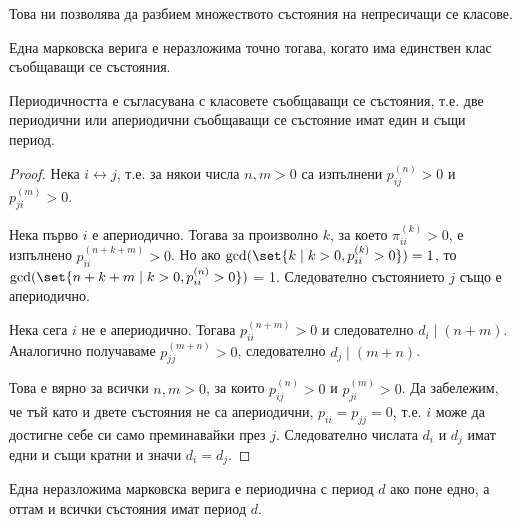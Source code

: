 \documentclass{../../common/topic}
\begin{document}
Това ни позволява да разбием множеството състояния на непресичащи се класове.

\begin{corollary}
  Една марковска верига е неразложима точно тогава, когато има единствен клас съобщаващи се състояния.
\end{corollary}

\begin{proposition}
  Периодичността е съгласувана с класовете съобщаващи се състояния, т.е. две периодични или апериодични съобщаващи се състояние имат един и същи период.
\end{proposition}
\begin{proof}
  Нека \( i \leftrightarrow j \), т.е. за някои числа \( n, m > 0 \) са изпълнени \( p_{ij}^{(n)} > 0 \) и \( p_{ji}^{(m)} > 0 \).

  Нека първо \( i \) е апериодично. Тогава за произволно \( k \), за което \( \pi_{ii}^{(k)} > 0 \), е изпълнено \( p_{ii}^{(n+k+m)} > 0 \). Но ако \( \gcd (\set{ k \mid k > 0, p_{ii}^{(k)} > 0 }) = 1 \), то \( \gcd (\set{ n+k+m \mid k > 0, p_{ii}^{(n)} > 0 }) \) = 1. Следователно състоянието \( j \) също е апериодично.

  Нека сега \( i \) не е апериодично. Тогава \( p_{ii}^{(n+m)} > 0 \) и следователно \( d_i \mid (n+m) \). Аналогично получаваме \( p_{jj}^{(m+n)} > 0 \), следователно \( d_j \mid (m+n) \).

  Това е вярно за всички \( n, m > 0 \), за които \( p_{ij}^{(n)} > 0 \) и \( p_{ji}^{(m)} > 0 \). Да забележим, че тъй като и двете състояния не са апериодични, \( p_{ii} = p_{jj} = 0 \), т.е. \( i \) може да достигне себе си само преминавайки през \( j \). Следователно числата \( d_i \) и \( d_j \) имат едни и същи кратни и значи \( d_i = d_j \).
\end{proof}

\begin{corollary}
  Една неразложима марковска верига е периодична с период \( d \) ако поне едно, а оттам и всички състояния имат период \( d \).
\end{corollary}
\end{document}
